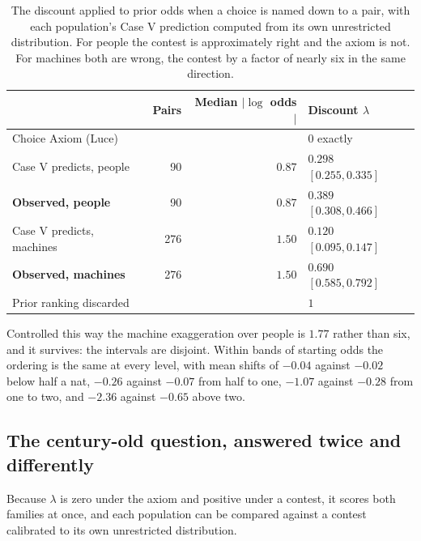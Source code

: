 \documentclass[11pt]{article}
\begin{document}
\begin{table}[ht]
\centering
\small
\begin{tabular}{lrrl}
\toprule
& Pairs & Median $\lvert\log$ odds$\rvert$ & Discount $\lambda$ \\
\midrule
Choice Axiom (Luce) & & & $0$ exactly \\
\midrule
Case V predicts, people & 90 & $0.87$ & $0.298$ $[0.255, 0.335]$ \\
\textbf{Observed, people} & 90 & $0.87$ & $\mathbf{0.389}$ $[0.308, 0.466]$ \\
\midrule
Case V predicts, machines & 276 & $1.50$ & $0.120$ $[0.095, 0.147]$ \\
\textbf{Observed, machines} & 276 & $1.50$ & $\mathbf{0.690}$ $[0.585, 0.792]$ \\
\midrule
Prior ranking discarded & & & $1$ \\
\bottomrule
\end{tabular}
\caption{The discount applied to prior odds when a choice is named down to a
pair, with each population's Case V prediction computed from its own
unrestricted distribution. For people the contest is approximately right and the
axiom is not. For machines both are wrong, the contest by a factor of nearly six
in the same direction.}
\label{tab:lambda}
\end{table}

Controlled this way the machine exaggeration over people is $1.77$ rather than
six, and it survives: the intervals are disjoint. Within bands of starting odds
the ordering is the same at every level, with mean shifts of $-0.04$ against
$-0.02$ below half a nat, $-0.26$ against $-0.07$ from half to one, $-1.07$
against $-0.28$ from one to two, and $-2.36$ against $-0.65$ above two.

\subsection{The century-old question, answered twice and differently}

Because $\lambda$ is zero under the axiom and positive under a contest, it scores
both families at once, and each population can be compared against a contest
calibrated to its own unrestricted distribution.
\end{document}
